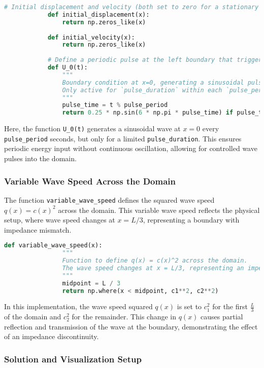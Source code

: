 \documentclass{article}
\begin{document}
		\begin{lstlisting}[language=Python]
			# Initial displacement and velocity (both set to zero for a stationary initial state)
			def initial_displacement(x):
				return np.zeros_like(x)
			
			def initial_velocity(x):
				return np.zeros_like(x)
			
			# Define a periodic pulse at the left boundary that triggers every `pulse_period`
			def U_0(t):
				"""
				Boundary condition at x=0, generating a sinusoidal pulse at regular intervals.
				Only active for `pulse_duration` within each `pulse_period`.
				"""
				pulse_time = t % pulse_period
				return 0.25 * np.sin(6 * np.pi * pulse_time) if pulse_time <= pulse_duration else 0
		\end{lstlisting}
		
		Here, the function \texttt{U\_0(t)} generates a sinusoidal wave at \( x = 0 \) every \texttt{pulse\_period} seconds, but only for a limited \texttt{pulse\_duration}. This ensures periodic energy input without continuous oscillation, allowing for controlled wave pulses into the domain.
		
		\subsubsection{Variable Wave Speed Across the Domain}
		
		The function \texttt{variable\_wave\_speed} defines the squared wave speed \( q(x) = c(x)^2 \) across the domain. This variable wave speed reflects the physical setup, where wave speed changes at \( x = L/3 \), representing a boundary with impedance mismatch.
		
		\begin{lstlisting}[language=Python]
			def variable_wave_speed(x):
				"""
				Function to define q(x) = c(x)^2 across the domain.
				The wave speed changes at x = L/3, representing an impedance discontinuity.
				"""
				midpoint = L / 3
				return np.where(x < midpoint, c1**2, c2**2)
		\end{lstlisting}
		
		In this implementation, the wave speed squared \( q(x) \) is set to \( c_1^2 \) for the first \( \frac{L}{3} \) of the domain and \( c_2^2 \) for the remainder. This change in \( q(x) \) causes partial reflection and transmission of the wave at the boundary, demonstrating the effect of an impedance discontinuity.
		
		\subsubsection{Solution and Visualization Setup}
		
\end{document}

